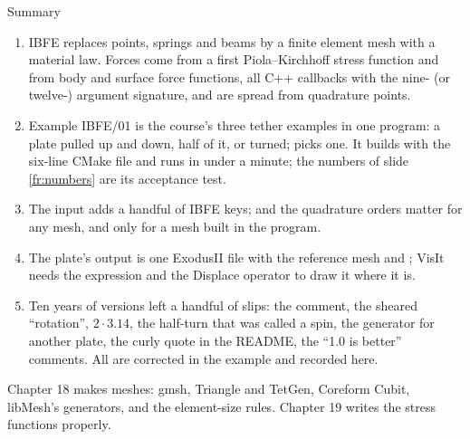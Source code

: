 \documentclass[aspectratio=169,11pt]{beamer}
\begin{document}
\begin{frame}{Summary}
\label{fr:summary}
\footnotesize
\begin{enumerate}
  \item IBFE replaces points, springs and beams by a finite element mesh with a material law. Forces come from a first Piola--Kirchhoff stress function and from body and surface force functions, all C++ callbacks with the nine- (or twelve-) argument signature, and are spread from quadrature points.
  \item Example IBFE/01 is the course's three tether examples in one program: a plate pulled up and down, half of it, or turned;  picks one. It builds with the six-line CMake file and runs in under a minute; the numbers of slide \ref{fr:numbers} are its acceptance test.
  \item The input adds a handful of IBFE keys;  and the quadrature orders matter for any mesh,  and  only for a mesh built in the program.
  \item The plate's output is one ExodusII file with the reference mesh and ; VisIt needs the  expression and the Displace operator to draw it where it is.
  \item Ten years of versions left a handful of slips: the  comment, the sheared ``rotation'', $2\cdot 3.14$, the half-turn that was called a spin, the  generator for another plate, the curly quote in the README, the ``1.0 is better'' comments. All are corrected in the example and recorded here.
\end{enumerate}
\begin{homebox}
\footnotesize Chapter 18 makes meshes: gmsh, Triangle and TetGen, Coreform Cubit, libMesh's generators, and the element-size rules. Chapter 19 writes the stress functions properly.
\end{homebox}
\end{frame}
\end{document}
